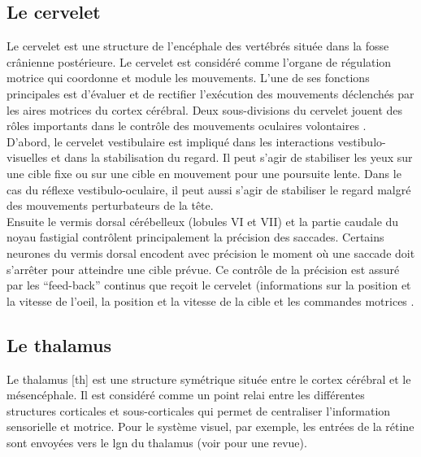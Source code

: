 \subsection{Le cervelet}
Le cervelet est une structure de l'encéphale des vertébrés située dans la fosse crânienne postérieure. Le cervelet est considéré comme l'organe de régulation motrice qui coordonne et module les mouvements. L'une de ses fonctions principales est d'évaluer et de rectifier l'exécution des mouvements déclenchés par les aires motrices du cortex cérébral. Deux sous-divisions du cervelet jouent des rôles importants dans le contrôle des mouvements oculaires volontaires \cite{Noda:1987,Robinson:2001}.\\ %
 
D'abord, le cervelet vestibulaire est impliqué dans les interactions vestibulo-visuelles et dans la stabilisation du regard. Il peut s'agir de stabiliser les yeux sur une cible fixe ou sur une cible en mouvement pour une poursuite lente. Dans le cas du réflexe vestibulo-oculaire, il peut aussi s'agir de stabiliser le regard malgré des mouvements perturbateurs de la tête.\\

Ensuite le vermis dorsal cérébelleux (lobules VI et VII) et la partie caudale du noyau fastigial contrôlent principalement la précision des saccades.
Certains neurones du vermis dorsal encodent avec précision le moment où une saccade doit s'arrêter pour atteindre une cible prévue. Ce contrôle de la précision est assuré par les ``feed-back'' continus que reçoit le cervelet (informations sur la position et la vitesse de l'oeil, la position et la vitesse de la cible et les commandes motrices \cite{Leigh:2006, Fuchs:1993}. \\


\subsection{Le thalamus}

Le thalamus [\gls{th}] est une structure symétrique située entre le cortex cérébral et le mésencéphale. Il est considéré comme un point relai entre les différentes structures corticales et sous-corticales qui permet de centraliser l'information sensorielle et motrice. Pour le système visuel, par exemple, les entrées de la rétine sont envoyées vers le \gls{lgn} du thalamus (voir \cite{Guillery:2002} pour une revue).\\

